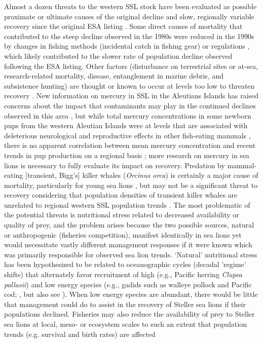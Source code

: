 \documentclass[nonumbib,leqno]{nrc1}
\begin{document}
Almost a dozen threats to the western SSL stock have been evaluated as possible proximate or ultimate causes of the original decline and slow, regionally variable recovery since the original ESA listing \citep{FerreroFritz2002,NMFS2008,AtkinsonEtAl2008}.  Some direct causes of mortality that contributed to the steep decline observed in the 1980s were reduced in the 1990s by changes in fishing methods (incidental catch in fishing gear) or regulations \citep[prohibiting shooting at or near a Steller sea lion and 3 nm no-entry zones around sea lion breeding locations;][]{FritzEtAl1995,FerreroFritz2002,NMFS2008}, which likely contributed to the slower rate of population decline observed following the ESA listing.  Other factors (disturbance on terrestrial sites or at-sea, research-related mortality, disease, entanglement in marine debris, and subsistence hunting) are thought or known to occur at levels too low to threaten recovery \citep{AtkinsonEtAl2008,NMFS2008}.  New information on mercury in SSL in the Aleutians Islands has raised concerns about the impact that contaminants may play in the continued declines observed in this area \citep{CastelliniEtAl2012,ReaEtAl2013}, but while total mercury concentrations in some newborn pups from the western Aleutian Islands were at levels that are associated with deleterious neurological and reproductive effects in other fish-eating mammals \citep{ReaEtAl2013}, there is no apparent correlation between mean mercury concentration and recent trends in pup production on a regional basis \citep{CastelliniEtAl2012}; more research on mercury in sea lions is necessary to fully evaluate its impact on recovery.  Predation by mammal-eating [transient, Bigg's] killer whales ({\it Orcinus orca}) is certainly a major cause of mortality, particularly for young sea lions \citep{HeiseEtAl2003,SpringerEtAl2003,WilliamsEtAl2004,ManiscalcoEtAl2007,HorningMellish2012}, but may not be a significant threat to recovery considering that population densities of transient killer whales are unrelated to regional western SSL population trends \citep{ZerbiniEtAl2007,DurbanEtAl2010,JohnsonFritzInReview}.  The most problematic of the potential threats is nutritional stress related to decreased availability or quality of prey, and the problem arises because the two possible sources, natural or anthropogenic (fisheries competition), manifest identically in sea lions yet would necessitate vastly different management responses if it were known which was primarily responsible for observed sea lion trends.  `Natural' nutritional stress has been hypothesized to be related to oceanographic cycles (decadal 'regime' shifts) that alternately favor recruitment of high (e.g., Pacific herring {\it Clupea pallasii}) and low energy species (e.g., gadids such as walleye pollock and Pacific cod; \citealt{MantuaEtAl1997,HuntStabeno2002,TritesEtAl2007}, but also see \citealt{RudnickDavis2003,FritzHinckley2005}).  When low energy species are abundant, there would be little that management could do to assist in the recovery of Steller sea lions if their populations declined.  Fisheries may also reduce the availability of prey to Steller sea lions at local, meso- or ecosystem scales to such an extent that population trends (e.g. survival and birth rates) are affected 
\end{document}
